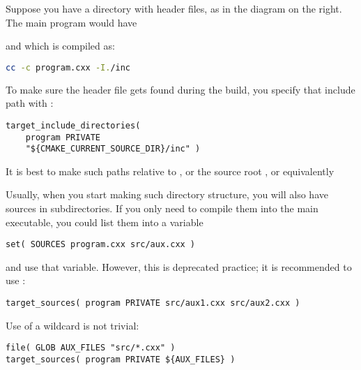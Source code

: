\begin{floatingfigure}[r]{2.5in}
  \begin{minipage}{2.5in}
  \end{minipage}
\end{floatingfigure}
%
Suppose you have a directory with header files,
as in the diagram on the right.
The main program would have
\begingroup\lstset{language=C++}

\endgroup
and which is compiled as:
\begin{lstlisting}[language=bash]
cc -c program.cxx -I./inc
\end{lstlisting}
To make sure the header file gets found during the build,
you specify that include path with :
\begin{lstlisting}
target_include_directories(
	program PRIVATE
	"${CMAKE_CURRENT_SOURCE_DIR}/inc" )
\end{lstlisting}
It is best to make such paths relative to
,
or the source root ,
or equivalently 

\begin{floatingfigure}[r]{2.5in}\vskip3in\end{floatingfigure}
%
Usually, when you start making such directory structure,
you will also have sources in subdirectories.
If you only need to compile them into the main executable,
you could list them into a variable
\begin{lstlisting}
set( SOURCES program.cxx src/aux.cxx )
\end{lstlisting}
and use that variable.
However, this is deprecated practice;
it is recommended to use :
\begin{lstlisting}
target_sources( program PRIVATE src/aux1.cxx src/aux2.cxx )
\end{lstlisting}
Use of a wildcard is not trivial:
\begin{lstlisting}
file( GLOB AUX_FILES "src/*.cxx" )
target_sources( program PRIVATE ${AUX_FILES} )
\end{lstlisting}


